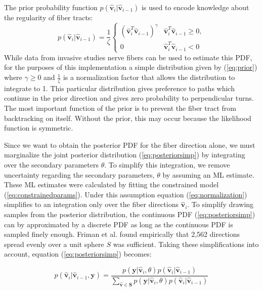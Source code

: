 The prior probability function $p(\mathbf{\hat{v}}_i | \mathbf{\hat{v}}_{i-1})$ is used to encode knowledge about the regularity of fiber tracts:
\begin{equation} \label{eq:prior}
p(\mathbf{\hat{v}}_i | \mathbf{\hat{v}}_{i-1}) = 
\frac{1}{\zeta} \left\{\begin{array}{ll}
	(\mathbf{\hat{v}}_i^T\mathbf{\hat{v}}_{i-1})^\gamma & \mathbf{\hat{v}}_i^T\mathbf{\hat{v}}_{i-1} \ge 0, \\
	0 & \mathbf{\hat{v}}_i^T\mathbf{\hat{v}}_{i-1} < 0
 \end{array} \right.
\end{equation}
While data from invasive studies nerve fibers can be used to estimate this PDF, for the purposes of this implementation a simple distribution given by (\ref{eq:prior}) where $\gamma \ge 0$ and $\frac{1}{\zeta}$ is a normalization factor that allows the distribution to integrate to 1.  This particular distribution gives preference to paths which continue in the prior direction and gives zero probability to perpendicular turns.  The most important function of the prior is to prevent the fiber tract from backtracking on itself.  Without the prior, this may occur because the likelihood function is symmetric.

Since we want to obtain the posterior PDF for the fiber direction alone, we must marginalize the joint posterior distribution (\ref{eq:posteriorsimp}) by integrating over the secondary parameters $\theta$.  To simplify this integration, we remove uncertainty regarding the secondary parameters, $\theta$ by assuming an ML estimate.  These ML estimates were calculated by fitting the constrained model (\ref{eq:constrainedparams}).  Under this assumption equation (\ref{eq:normalization}) simplifies to an integration only over the fiber directions $\mathbf{\hat{v}}_i$.  To simplify drawing samples from the posterior distribution, the continuous PDF (\ref{eq:posteriorsimp}) can by approximated by a discrete PDF as long as the continuous PDF is sampled finely enough.  Friman et al. \cite{frimanTMI06} found empirically that 2,562 directions spread evenly over a unit sphere $S$ was sufficient.  Taking these simplifications into account, equation (\ref{eq:posteriorsimp}) becomes:

\begin{equation} \label{eq:posteriordiscrete}
p(\mathbf{\hat{v}}_i|\mathbf{\hat{v}}_{i-1}, \mathbf{y}) = 
\frac{p(\mathbf{y}| \mathbf{\hat{v}}_i, \theta) p(\mathbf{\hat{v}}_i | \mathbf{\hat{v}}_{i-1})}
{\sum_{\mathbf{\hat{v}} \in \mathbf{S}} p(\mathbf{y}| \mathbf{\hat{v}}_i, \theta) p(\mathbf{\hat{v}}_i | \mathbf{\hat{v}}_{i-1})}
\end{equation}

